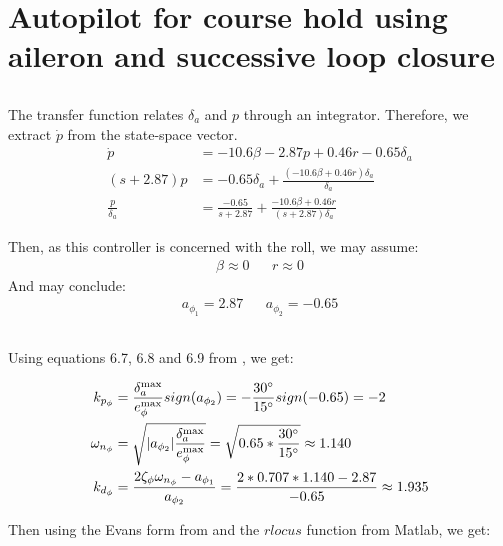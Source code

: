 \section{Autopilot for course hold using aileron and successive loop closure}
\subsection{}
The transfer function relates $\delta_a$ and $p$ through an integrator. Therefore, we extract $\dot{p}$ from the state-space vector. 
\begin{align*}
    \dot{p} &= -10.6 \beta - 2.87 p + 0.46 r - 0.65 \delta_a \\
    (s + 2.87) p &= - 0.65 \delta_a  + \frac{(-10.6 \beta + 0.46 r) \delta_a }{\delta_a} \\
    \frac{p}{\delta_a} &= \frac{-0.65}{s + 2.87} + \frac{-10.6 \beta + 0.46 r}{(s + 2.87)\delta_a}
\end{align*}

Then, as this controller is concerned with the roll, we may assume: %
\begin{align*}
    \beta \approx 0 && r \approx 0
\end{align*}
And may conclude: 
\begin{align*}
    a_{\phi_1} = 2.87 && a_{\phi_2} = -0.65
\end{align*}

\subsection{}
Using equations 6.7, 6.8 and 6.9 from \cite[page 100]{beard_mclain_2012}, we get: 

\begin{align*}
    k_{p_\phi} &= \frac{\delta_{a}^{\max}}{e_{\phi}^{\max}} sign(a_{\phi_2}) 
    = - \frac{30 \degree}{15 \degree} sign(-0.65)
    = -2 \\
    \omega_{n_{\phi}} &= \sqrt{|a_{\phi_2}| \frac{\delta_a^{\max}}{e_{\phi}^{\max}}} 
    = \sqrt{0.65 * \frac{30 \degree}{15 \degree}} 
    \approx 1.140 \\
    k_{d_\phi} &= \frac{2 \zeta_{\phi} \omega_{n_\phi} - a_{\phi_1}}{a_{\phi_2}} 
    = \frac{2 * 0.707 * 1.140 - 2.87}{-0.65}
    \approx 1.935
\end{align*}

Then using the Evans form from \cite[page 102]{beard_mclain_2012} and the $rlocus$ function from Matlab, we get: 

